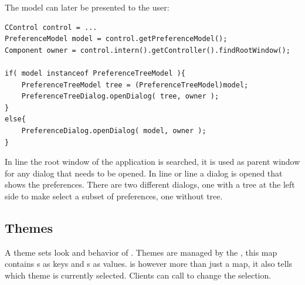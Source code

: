 The model can later be presented to the user:
\begin{lstlisting}
CControl control = ...
PreferenceModel model = control.getPreferenceModel();
Component owner = control.intern().getController().findRootWindow();

if( model instanceof PreferenceTreeModel ){
	PreferenceTreeModel tree = (PreferenceTreeModel)model;
	PreferenceTreeDialog.openDialog( tree, owner );
}
else{
	PreferenceDialog.openDialog( model, owner );
}
\end{lstlisting}
In line  the root window of the application is searched, it is used as parent window for any dialog that needs to be opened. In line  or line  a dialog is opened that shows the preferences. There are two different dialogs, one with a tree at the left side to make select a subset of preferences, one without tree.



\subsection{Themes} \label{sec:theme}
A theme sets look and behavior of . Themes are managed by the , this map contains s as keys and s as values.  is however more than just a map, it also tells which theme is currently selected. Clients can call  to change the selection.

